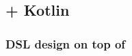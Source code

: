 \documentclass[presentation]{beamer}
\begin{document}
\subsection{\twopkt{} + Kotlin}

\begin{frame}%
    \frametitle{DSL design on top of \twopkt}


\end{frame}
\end{document}
